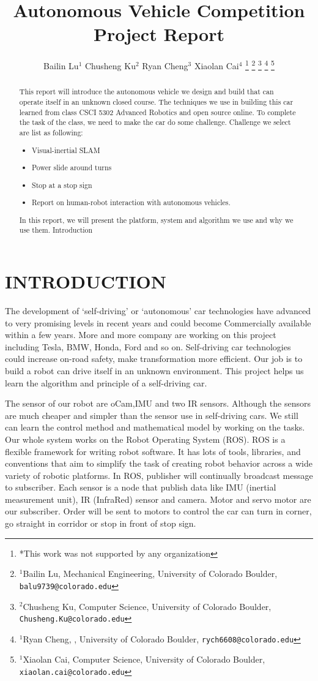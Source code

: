 \documentclass[a4paper, 10pt, conference]{ieeeconf}      %
\title{\LARGE \bf
Autonomous Vehicle Competition Project Report
}
\author{Bailin Lu$^{1}$ Chusheng Ku$^{2}$ Ryan Cheng$^{3}$ Xiaolan Cai$^{4}$%
\thanks{*This work was not supported by any organization}%
\thanks{$^{1}$Bailin Lu, Mechanical Engineering,
        University of Colorado Boulder,
        {\tt\small balu9739@colorado.edu}}%
\thanks{$^{2}$Chusheng Ku, Computer Science,
        University of Colorado Boulder,
        {\tt\small Chusheng.Ku@colorado.edu}}%
\thanks{$^{1}$Ryan Cheng, ,
        University of Colorado Boulder,
        {\tt\small rych6608@colorado.edu}}%
\thanks{$^{1}$Xiaolan Cai, Computer Science,
        University of Colorado Boulder,
        {\tt\small xiaolan.cai@colorado.edu}}%
}
\begin{document}
\maketitle
\thispagestyle{empty}
\pagestyle{empty}

\begin{abstract}

This report will introduce the autonomous vehicle we design and build that can operate itself in an unknown closed course. The techniques we use in building this car learned from class CSCI 5302 Advanced Robotics and open source online. To complete the task of the class, we need to make the car do some challenge. Challenge we select are list as following:
\begin{itemize}
\item Visual-inertial SLAM
\item Power slide around turns
\item Stop at a stop sign
\item Report on human-robot interaction with autonomous vehicles.

\end{itemize}
In this report, we will present the platform, system and algorithm we use and why we use them.
Introduction

\end{abstract}


\section{INTRODUCTION}
The development of ‘self-driving’ or ‘autonomous’ car technologies have advanced to very promising levels in recent years and could become Commercially available within a few years\cite{self-dctb}. More and more company are working on this project including Tesla, BMW, Honda, Ford and so on. Self-driving car technologies could increase on-road safety, make transformation more efficient. Our job is to build a robot can drive itself in an unknown environment. This project helps us learn the algorithm and principle of a self-driving car.

The sensor of our robot are oCam,IMU and two IR sensors. Although the sensors are much cheaper and simpler than the sensor use in self-driving cars. We still can learn the control method and mathematical model by working on the tasks.
Our whole system works on the Robot Operating System (ROS). ROS is a flexible framework for writing robot software. It has lots of tools, libraries, and conventions that aim to simplify the task of creating robot behavior across a wide variety of robotic platforms. In ROS, publisher will continually broadcast message to subscriber. Each sensor is a node that publish data like IMU (inertial measurement unit), IR (InfraRed) sensor and camera. Motor and servo motor are our subscriber. Order will be sent to motors to control the car can turn in corner, go straight in corridor or stop in front of stop sign.
\end{document}
